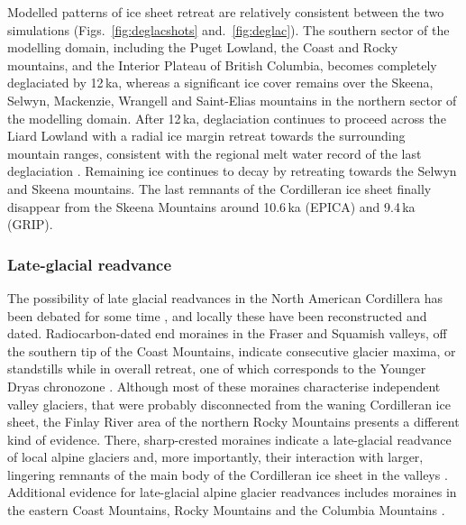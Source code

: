 \documentclass[tc]{copernicus}
\begin{document}
Modelled patterns of ice sheet retreat are relatively consistent between the
two simulations (Figs.~\ref{fig:deglacshots} and.~\ref{fig:deglac}). The
southern sector of the modelling domain, including the Puget Lowland, the Coast
and Rocky mountains, and the Interior Plateau of British Columbia, becomes
completely deglaciated by 12\,ka, whereas a significant ice cover remains over
the Skeena, Selwyn, Mackenzie, Wrangell and Saint-Elias mountains in the
northern sector of the modelling domain. After 12\,ka, deglaciation continues
to proceed across the Liard Lowland with a radial ice margin retreat towards
the surrounding mountain ranges, consistent with the regional melt water record
of the last deglaciation \citep{Margold.etal.2013}. Remaining ice continues to
decay by retreating towards the Selwyn and Skeena mountains. The last remnants
of the Cordilleran ice sheet finally disappear from the Skeena Mountains around
10.6\,ka (EPICA) and 9.4\,ka (GRIP).

\subsubsection{Late-glacial readvance}

The possibility of late glacial readvances in the North American Cordillera has
been debated for some time \citep{Osborn.Gerloff.1997}, and locally these have
been reconstructed and dated. Radiocarbon-dated end moraines in the Fraser and
Squamish valleys, off the southern tip of the Coast Mountains, indicate
consecutive glacier maxima, or standstills while in overall retreat, one of
which corresponds to the Younger Dryas chronozone \citep{Clague.etal.1997,
Friele.Clague.2002, Friele.Clague.2002a, Kovanen.2002,
Kovanen.Easterbrook.2002}. Although most of these moraines characterise
independent valley glaciers, that were probably disconnected from the waning
Cordilleran ice sheet, the Finlay River
area of the northern Rocky Mountains presents a different kind of evidence.
There, sharp-crested moraines indicate a late-glacial readvance of local alpine
glaciers and, more importantly, their interaction with larger, lingering
remnants of the main body of the Cordilleran ice sheet in the valleys
\citep{Lakeman.etal.2008}. Additional evidence for late-glacial
alpine glacier readvances includes moraines in the eastern Coast Mountains,
Rocky Mountains and the Columbia Mountains \citep{Osborn.Gerloff.1997,
Menounos.etal.2008}.
\end{document}
